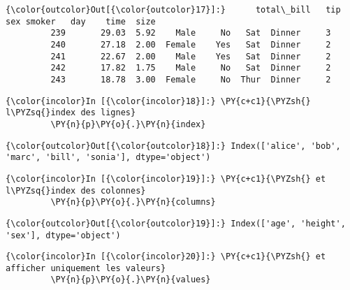 \begin{Verbatim}[commandchars=\\\{\},frame=single,framerule=0.3mm,rulecolor=\color{cellframecolor}]
{\color{outcolor}Out[{\color{outcolor}17}]:}      total\_bill   tip     sex smoker   day    time  size
         239       29.03  5.92    Male     No   Sat  Dinner     3
         240       27.18  2.00  Female    Yes   Sat  Dinner     2
         241       22.67  2.00    Male    Yes   Sat  Dinner     2
         242       17.82  1.75    Male     No   Sat  Dinner     2
         243       18.78  3.00  Female     No  Thur  Dinner     2
\end{Verbatim}
            
    \begin{Verbatim}[commandchars=\\\{\},frame=single,framerule=0.3mm,rulecolor=\color{cellframecolor}]
{\color{incolor}In [{\color{incolor}18}]:} \PY{c+c1}{\PYZsh{} l\PYZsq{}index des lignes}
         \PY{n}{p}\PY{o}{.}\PY{n}{index}
\end{Verbatim}


\begin{Verbatim}[commandchars=\\\{\},frame=single,framerule=0.3mm,rulecolor=\color{cellframecolor}]
{\color{outcolor}Out[{\color{outcolor}18}]:} Index(['alice', 'bob', 'marc', 'bill', 'sonia'], dtype='object')
\end{Verbatim}
            
    \begin{Verbatim}[commandchars=\\\{\},frame=single,framerule=0.3mm,rulecolor=\color{cellframecolor}]
{\color{incolor}In [{\color{incolor}19}]:} \PY{c+c1}{\PYZsh{} et l\PYZsq{}index des colonnes}
         \PY{n}{p}\PY{o}{.}\PY{n}{columns}
\end{Verbatim}


\begin{Verbatim}[commandchars=\\\{\},frame=single,framerule=0.3mm,rulecolor=\color{cellframecolor}]
{\color{outcolor}Out[{\color{outcolor}19}]:} Index(['age', 'height', 'sex'], dtype='object')
\end{Verbatim}
            
    \begin{Verbatim}[commandchars=\\\{\},frame=single,framerule=0.3mm,rulecolor=\color{cellframecolor}]
{\color{incolor}In [{\color{incolor}20}]:} \PY{c+c1}{\PYZsh{} et afficher uniquement les valeurs}
         \PY{n}{p}\PY{o}{.}\PY{n}{values}
\end{Verbatim}


